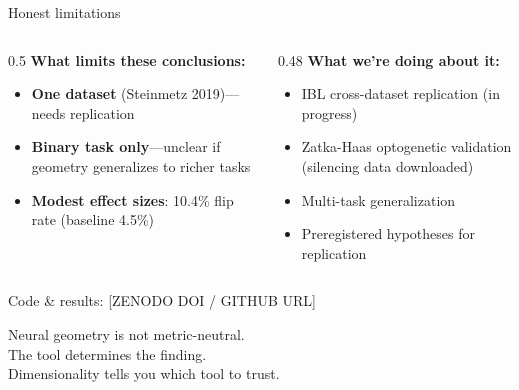 \documentclass[aspectratio=169,11pt]{beamer}
\begin{document}
\begin{frame}{Honest limitations}
\begin{columns}[T]
\begin{column}{0.5\textwidth}
\textbf{What limits these conclusions:}
\begin{itemize}
  \item \textbf{One dataset} (Steinmetz 2019)---needs replication
  \item \textbf{Binary task only}---unclear if geometry generalizes to richer tasks
  \item \textbf{Modest effect sizes}: 10.4\% flip rate (baseline 4.5\%)
\end{itemize}
\end{column}
\begin{column}{0.48\textwidth}
\textbf{What we're doing about it:}
\begin{itemize}
  \item IBL cross-dataset replication (in progress)
  \item Zatka-Haas optogenetic validation (silencing data downloaded)
  \item Multi-task generalization
  \item Preregistered hypotheses for replication
\end{itemize}
\end{column}
\end{columns}
\end{frame}


\begin{frame}[standout]
  Code \& results: {\small [ZENODO DOI / GITHUB URL]}

  \vspace{1em}
  Neural geometry is not metric-neutral.\\[0.3em]
  The tool determines the finding.\\[0.3em]
  Dimensionality tells you which tool to trust.
\end{frame}
\end{document}
